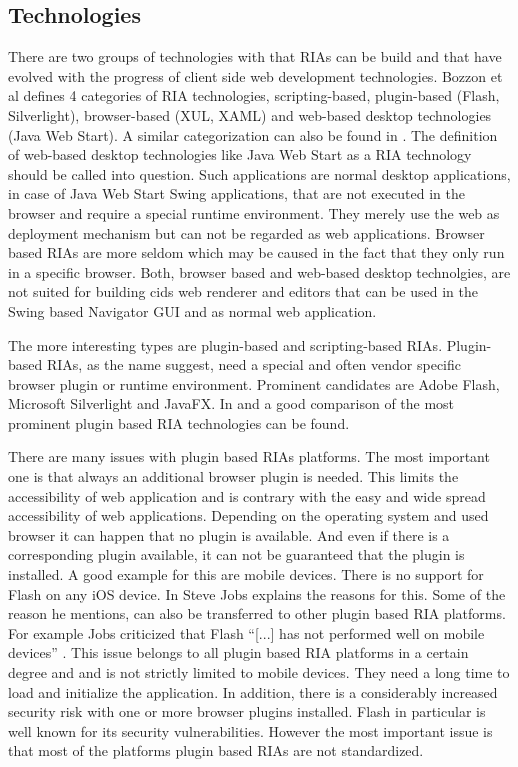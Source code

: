 \subsection{Technologies}

There are two groups of technologies with that RIAs can be build and that have evolved with the progress of client side web development technologies.
Bozzon et al \autocite{ria-classification-1} defines 4 categories of RIA technologies, scripting-based, plugin-based (Flash, Silverlight), browser-based (XUL, XAML) and web-based desktop technologies (Java Web Start).
A similar categorization can also be found in \autocite{ria-classification-2}.
The definition of web-based desktop technologies like Java Web Start as a RIA technology should be called into question.
Such applications are normal desktop applications, in case of Java Web Start Swing applications, that are not executed in the browser and require a special runtime environment.
They merely use the web as deployment mechanism but can not be regarded as web applications.
Browser based RIAs are more seldom which may be caused in the fact that they only run in a specific browser.
Both, browser based and web-based desktop technolgies,  are not suited for building cids web renderer and editors that can be used in the Swing based Navigator GUI and as normal web application.

The more interesting types are plugin-based and scripting-based RIAs.
Plugin-based RIAs, as the name suggest, need a special and often vendor specific browser plugin or runtime environment.
Prominent candidates are Adobe Flash, Microsoft Silverlight and JavaFX.
In \autocite[]{ria-comp-1} and \autocite[]{ria-comp-2} a good comparison of the most prominent plugin based RIA technologies can be found.

There are many issues with plugin based RIAs platforms.
The most important one is that always an additional browser plugin is needed.
This limits the accessibility of web application and is contrary with the easy and wide spread accessibility of web applications.
Depending on the operating system and used browser it can happen that no plugin is available.
And even if there is a corresponding plugin available, it can not be guaranteed that the plugin is installed.
A good example for this are mobile devices.
There is no support for Flash on any iOS device.
In \autocite[]{jobs-thoughts-on-flash} Steve Jobs explains the reasons for this.
Some of the reason he mentions, can also be transferred to other plugin based RIA platforms.
For example Jobs criticized that Flash \enquote{[...] has not performed well on mobile devices} \autocite[]{jobs-thoughts-on-flash}.
This issue belongs to all plugin based RIA platforms in a certain degree and and is not strictly limited to mobile devices.
They need a long time to load and initialize the application.
In addition, there is a considerably increased security risk with one or more browser plugins installed.
Flash in particular is well known for its security vulnerabilities.
However the most important issue is that most of the platforms plugin based RIAs are not standardized.

